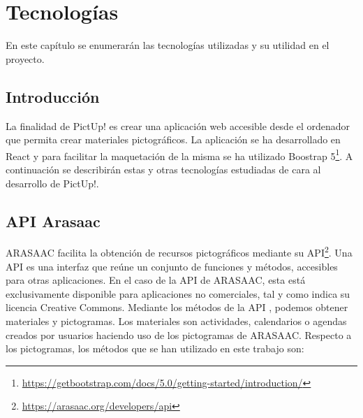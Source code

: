 \chapter{Tecnologías}
\label{cap:introduccion}


\begin{resumen}
	En este capítulo se enumerarán las tecnologías utilizadas y su utilidad en el proyecto.
\end{resumen}

\label{cap1:sec:Motivacion}


\section{Introducción}

La finalidad de PictUp! es crear una aplicación web accesible desde el ordenador que permita crear materiales pictográficos. La aplicación se ha desarrollado en React y para facilitar la maquetación de la misma se ha utilizado Boostrap 5\footnote{\url{https://getbootstrap.com/docs/5.0/getting-started/introduction/}}. 
A continuación se describirán estas y otras tecnologías estudiadas de cara al desarrollo de PictUp!.


\section{API Arasaac}
\label{cap3:sec:apiarasaac}
ARASAAC facilita la obtención de recursos pictográficos mediante su API\footnote{\url{https://arasaac.org/developers/api}}. Una API es una interfaz que reúne un conjunto de funciones y métodos, accesibles para otras aplicaciones. En el caso de la API de ARASAAC, esta está exclusivamente disponible para aplicaciones no comerciales, tal y como indica su licencia Creative Commons.
Mediante los métodos de la API , podemos obtener materiales y pictogramas. Los materiales  son actividades, calendarios o agendas creados por usuarios haciendo uso de los pictogramas de ARASAAC. Respecto a los pictogramas, los métodos que se han utilizado en este trabajo son:

